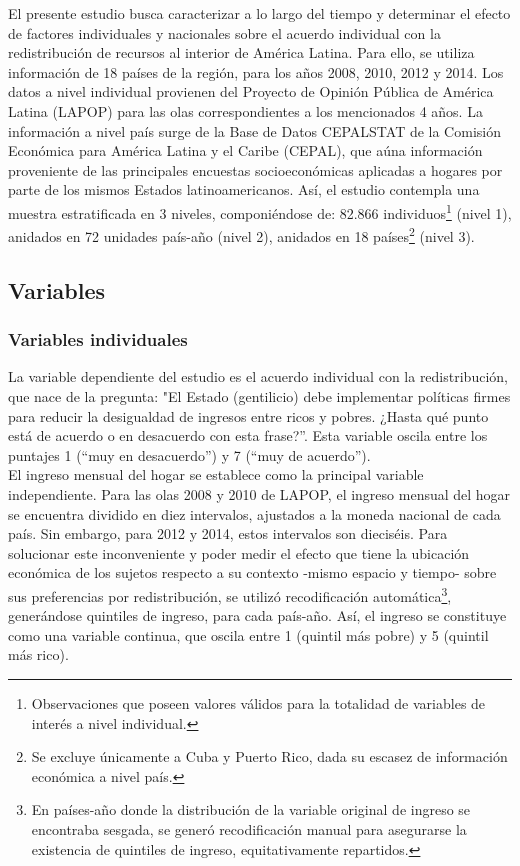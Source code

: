 \documentclass[12pt,letterpaper]{article}
\begin{document}
El presente estudio busca caracterizar a lo largo del tiempo y determinar el efecto de factores individuales y nacionales sobre el acuerdo individual con la redistribución de recursos al interior de América Latina. Para ello, se utiliza información de 18 países de la región, para los años 2008, 2010, 2012 y 2014. Los datos a nivel individual provienen del Proyecto de Opinión Pública de América Latina (LAPOP) para las olas correspondientes a los mencionados 4 años. La información a nivel país surge de la Base de Datos CEPALSTAT de la Comisión Económica para América Latina y el Caribe (CEPAL), que aúna información proveniente de las principales encuestas socioeconómicas aplicadas a hogares por parte de los mismos Estados latinoamericanos. Así, el estudio contempla una muestra estratificada en 3 niveles, componiéndose de: 82.866 individuos\footnote{Observaciones que poseen valores válidos para la totalidad de variables de interés a nivel individual.} (nivel 1), anidados en 72 unidades país-año (nivel 2), anidados en 18 países\footnote{Se excluye únicamente a Cuba y Puerto Rico, dada su escasez de información económica a nivel país.} (nivel 3).

\subsection{Variables \label{sec:sec32}}

\subsubsection{Variables individuales \label{sec:sec321}}

La variable dependiente del estudio es el acuerdo individual con la redistribución, que nace de la pregunta: "El Estado (gentilicio) debe implementar políticas firmes para reducir la desigualdad de ingresos entre ricos y pobres. ¿Hasta qué punto está de acuerdo o en desacuerdo con esta frase?”. Esta variable oscila entre los puntajes 1 (“muy en desacuerdo”) y 7 (“muy de acuerdo”).\\

El ingreso mensual del hogar se establece como la principal variable independiente. Para las olas 2008 y 2010 de LAPOP, el ingreso mensual del hogar se encuentra dividido en diez intervalos, ajustados a la moneda nacional de cada país. Sin embargo, para 2012 y 2014, estos intervalos son dieciséis. Para solucionar este inconveniente y poder medir el efecto que tiene la ubicación económica de los sujetos respecto a su contexto -mismo espacio y tiempo- sobre sus preferencias por redistribución, se utilizó recodificación automática\footnote{En países-año donde la distribución de la variable original de ingreso se encontraba sesgada, se generó recodificación manual para asegurarse la existencia de quintiles de ingreso, equitativamente repartidos.}, generándose quintiles de ingreso, para cada país-año. Así, el ingreso se constituye como una variable continua, que oscila entre 1 (quintil más pobre) y 5 (quintil más rico).\\
\end{document}
